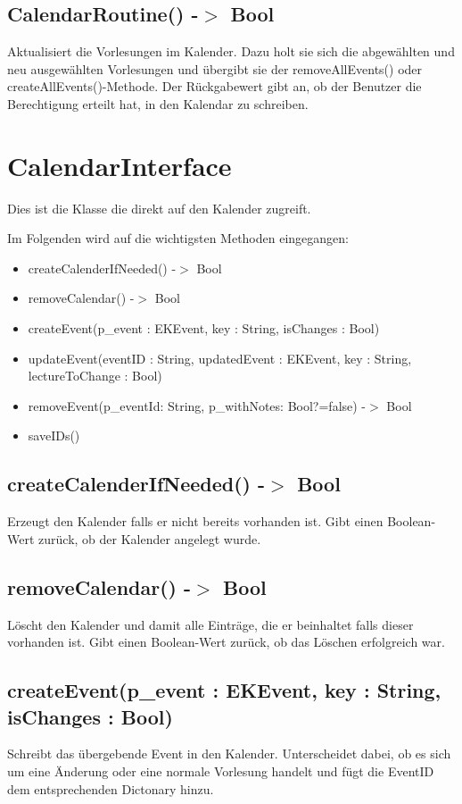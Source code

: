 \subsection[CalendarRoutine]{CalendarRoutine() -$>$ Bool}
Aktualisiert die Vorlesungen im Kalender. Dazu holt sie sich die abgewählten und neu ausgewählten Vorlesungen und übergibt sie der removeAllEvents() oder createAllEvents()-Methode. Der Rückgabewert gibt an, ob der Benutzer die Berechtigung erteilt hat, in den Kalendar zu schreiben.

\newpage
\section{CalendarInterface}
Dies ist die Klasse die direkt auf den Kalender zugreift. 

Im Folgenden wird auf die wichtigsten Methoden eingegangen:
\begin{itemize}
     \item createCalenderIfNeeded() -$>$ Bool
     \item removeCalendar() -$>$ Bool
     \item createEvent(p\_event : EKEvent, key : String, isChanges : Bool)
     \item updateEvent(eventID : String, updatedEvent : EKEvent, key : String, lectureToChange : Bool)
     \item removeEvent(p\_eventId: String, p\_withNotes: Bool?=false) -$>$ Bool
     \item saveIDs()
\end{itemize}

\subsection[createCalenderIfNeeded]{createCalenderIfNeeded() -$>$ Bool}
Erzeugt den Kalender falls er nicht bereits vorhanden ist. Gibt einen Boolean-Wert zurück, ob der Kalender angelegt wurde.

\subsection[removeCalendar]{removeCalendar() -$>$ Bool}
Löscht den Kalender und damit alle Einträge, die er beinhaltet falls dieser vorhanden ist. Gibt einen Boolean-Wert zurück, ob das Löschen erfolgreich war.

\subsection[createEvent]{createEvent(p\_event : EKEvent, key : String, isChanges : Bool)}
Schreibt das übergebende Event in den Kalender. Unterscheidet dabei, ob es sich um eine Änderung oder eine normale Vorlesung handelt und fügt die EventID dem entsprechenden Dictonary hinzu. 

